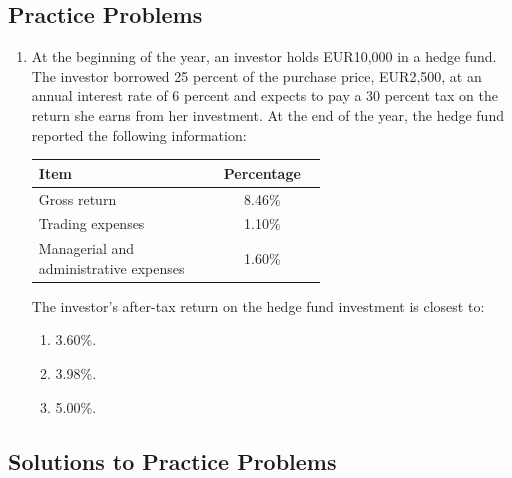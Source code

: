 \subsection{Practice Problems}
\label{subsec:app_Problems_M2}

\begin{enumerate}
	\item At the beginning of the year, an investor holds EUR10,000 in a hedge fund. The investor borrowed 25 percent of the purchase price, EUR2,500, at an annual interest rate of 6 percent and expects to pay a 30 percent tax on the return she earns from her investment. At the end of the year, the hedge fund reported the following information:
	      \begin{center}
	      \begin{tabular}{p{0.6\linewidth}  c}
		      \toprule
		      \textbf{Item} & \textbf{Percentage} \\
		      \midrule
		      Gross return & 8.46\% \\
		      Trading expenses & 1.10\% \\
		      Managerial and administrative expenses & 1.60\% \\
		      \bottomrule
	      \end{tabular}
	      \end{center}
	      The investor's after-tax return on the hedge fund investment is closest to:
	      \begin{enumerate}[label=\Alph*.]
		      \item 3.60\%.
		      \item 3.98\%.
		      \item 5.00\%.
	      \end{enumerate}
\end{enumerate}

\subsection{Solutions to Practice Problems}
\label{subsec:app_Solutions_M2}

